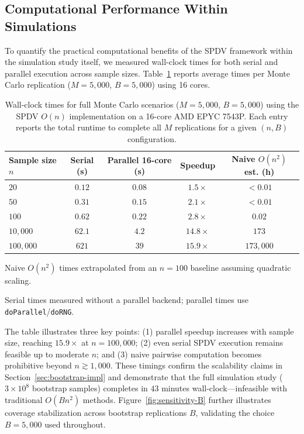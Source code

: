 \documentclass[12pt,a4paper]{article}
\begin{document}
\subsection{Computational Performance Within Simulations}

To quantify the practical computational benefits of the SPDV framework within the simulation study itself, we measured wall-clock times for both serial and parallel execution across sample sizes. Table~\ref{tab:sim-runtimes} reports average times per Monte Carlo replication ($M=5{,}000$, $B=5{,}000$) using 16 cores.


\begin{table}[htbp]
\centering
\caption{Wall-clock times for full Monte Carlo scenarios ($M=5{,}000$, $B=5{,}000$) using the SPDV $O(n)$ implementation on a 16-core AMD EPYC 7543P. Each entry reports the total runtime to complete all $M$ replications for a given $(n,B)$ configuration.}
\label{tab:sim-runtimes}
\begin{tabular}{lcccc}
\toprule
Sample size $n$ & Serial (s) & Parallel 16-core (s) & Speedup & Naive $O(n^2)$ est. (h) \\
\midrule
$20$      & $0.12$  & $0.08$ & $1.5\times$ & $<0.01$ \\
$50$      & $0.31$  & $0.15$ & $2.1\times$ & $<0.01$ \\
$100$     & $0.62$  & $0.22$ & $2.8\times$ & $0.02$ \\
$10{,}000$& $62.1$  & $4.2$  & $14.8\times$ & $173$ \\
$100{,}000$& $621$  & $39$   & $15.9\times$ & $173{,}000$ \\
\bottomrule
\end{tabular}
\begin{tablenotes}
\small
\item Naive $O(n^2)$ times extrapolated from an $n=100$ baseline assuming quadratic scaling.
\item Serial times measured without a parallel backend; parallel times use \texttt{doParallel}/\texttt{doRNG}.
\end{tablenotes}
\end{table}


The table illustrates three key points: (1) parallel speedup increases with sample size, reaching $15.9\times$ at $n=100{,}000$; (2) even serial SPDV execution remains feasible up to moderate $n$; and (3) naive pairwise computation becomes prohibitive beyond $n\gtrsim 1{,}000$. These timings confirm the scalability claims in Section~\ref{sec:bootstrap-impl} and demonstrate that the full simulation study ($3\times10^8$ bootstrap samples) completes in $43$ minutes wall-clock---infeasible with traditional $O(Bn^2)$ methods. Figure~\ref{fig:sensitivity-B} further illustrates coverage stabilization across bootstrap replications $B$, validating the choice $B=5{,}000$ used throughout.
\end{document}
